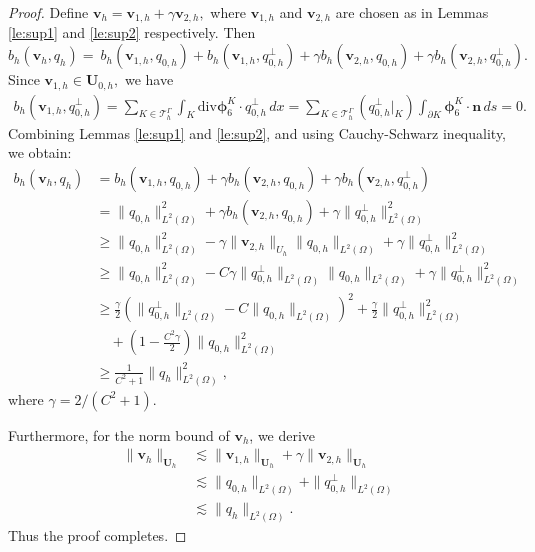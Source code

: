 \documentclass[a4paper,11pt,fleqn]{article}
\numberwithin{equation}{section}
\begin{document}
\begin{proof}
	Define $\boldsymbol{v}_h = \boldsymbol{v}_{1,h} + \gamma\boldsymbol{v}_{2,h},$ where $\boldsymbol{v}_{1,h}$ and $\boldsymbol{v}_{2,h}$ are chosen as in Lemmas \ref{le:sup1} and \ref{le:sup2} respectively. Then
	\begin{equation*}
		b_h(\boldsymbol{v}_h,q_h) = \ b_h(\boldsymbol{v}_{1,h},q_{0,h}) + b_h(\boldsymbol{v}_{1,h},q^{\perp}_{0,h}) + \gamma b_h(\boldsymbol{v}_{2,h},q_{0,h}) + \gamma b_h(\boldsymbol{v}_{2,h},q^{\perp}_{0,h}).
	\end{equation*}	
	Since $\boldsymbol{v}_{1,h} \in \boldsymbol{U}_{0,h},$ we have
	\begin{align*}
		b_h(\boldsymbol{v}_{1,h},q^{\perp}_{0,h}) 
		= \sum_{K\in \mathcal{T}_h^{\Gamma}} \int_K \mathrm{div}\boldsymbol{\phi}^{K}_6 \cdot q^{\perp}_{0,h} \, dx 
		= \sum_{K\in \mathcal{T}_h^{\Gamma}} (q^{\perp}_{0,h}|_{K}) \int_{\partial K} \boldsymbol{\phi}^K_6 \cdot \boldsymbol{n} \, ds = 0.
	\end{align*}
	Combining Lemmas \ref{le:sup1} and \ref{le:sup2}, and using Cauchy-Schwarz inequality, we obtain:
	\begin{align*}
		b_h(\boldsymbol{v}_h, q_h) 
		&= b_h(\boldsymbol{v}_{1,h}, q_{0,h}) + \gamma b_h(\boldsymbol{v}_{2,h}, q_{0,h}) + \gamma b_h(\boldsymbol{v}_{2,h}, q_{0,h}^\perp) \\
		&= \| q_{0,h} \|_{L^2(\Omega)}^2 + \gamma b_h(\boldsymbol{v}_{2,h}, q_{0,h}) + \gamma \| q_{0,h}^\perp \|_{L^2(\Omega)}^2 \\
		&\geq \| q_{0,h} \|_{L^2(\Omega)}^2 - \gamma \| \boldsymbol{v}_{2,h} \|_{U_h} \| q_{0,h} \|_{L^2(\Omega)} + \gamma \| q_{0,h}^\perp \|_{L^2(\Omega)}^2 \\
		&\geq \| q_{0,h} \|_{L^2(\Omega)}^2 - C \gamma \| q_{0,h}^\perp \|_{L^2(\Omega)} \| q_{0,h} \|_{L^2(\Omega)} + \gamma \| q_{0,h}^\perp \|_{L^2(\Omega)}^2 \\
		&\geq \frac{\gamma}{2} \left( \| q_{0,h}^\perp \|_{L^2(\Omega)} - C \| q_{0,h} \|_{L^2(\Omega)} \right)^2 + \frac{\gamma}{2} \| q_{0,h}^\perp \|_{L^2(\Omega)}^2 \\
		&\quad + \left(1 - \frac{C^2 \gamma}{2}\right) \| q_{0,h} \|_{L^2(\Omega)}^2 \\
		&\geq \frac{1}{C^2 + 1} \| q_h \|_{L^2(\Omega)}^2,
	\end{align*}
	where $\gamma = 2/(C^2+1).$ 
	
	Furthermore, for the norm bound of $\boldsymbol{v}_h$, we derive
	\begin{align*}
		\|\boldsymbol{v}_h\|_{\boldsymbol{U}_h}
		&\lesssim \|\boldsymbol{v}_{1,h}\|_{\boldsymbol{U}_h} + \gamma \|\boldsymbol{v}_{2,h}\|_{\boldsymbol{U}_h} \\
		&\lesssim \|q_{0,h}\|_{L^2(\Omega)} + \|q^{\perp}_{0,h}\|_{L^2(\Omega)} \\
		&\lesssim \|q_h\|_{L^2(\Omega)}.
	\end{align*}
	Thus the proof completes.
\end{proof}
\end{document}
